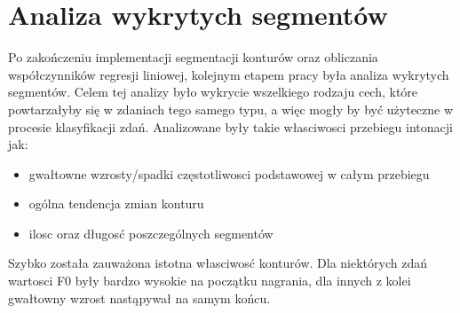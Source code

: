 \documentclass[a4paper,12 pt]{article}
\begin{document}
\section{Analiza wykrytych segmentów}
Po zakończeniu implementacji segmentacji konturów oraz obliczania współczynników regresji liniowej, kolejnym etapem pracy była analiza wykrytych segmentów. Celem tej analizy było wykrycie wszelkiego rodzaju cech, które powtarzałyby się w zdaniach tego samego typu, a więc mogły by być użyteczne w procesie klasyfikacji zdań. 
Analizowane były takie własciwosci przebiegu intonacji jak:
\begin{itemize}
\item{gwałtowne wzrosty/spadki częstotliwosci podstawowej w całym przebiegu }
\item{ogólna tendencja zmian konturu}
\item{ilosc oraz długosć poszczególnych segmentów}
\end{itemize}

Szybko została zauważona istotna własciwosć konturów. Dla niektórych zdań wartosci F0 były bardzo wysokie na początku nagrania, dla innych z kolei gwałtowny wzrost nastąpywał na samym końcu.
\end{document}
